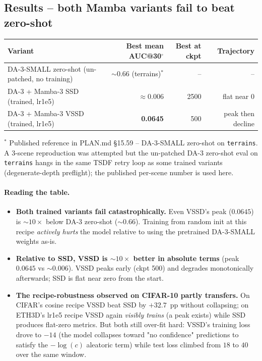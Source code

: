 \documentclass[11pt,a4paper]{article}
\begin{document}
\subsection{Results -- both Mamba variants fail to beat zero-shot}

\begin{center}
\begin{tabular}{lrrr}
\toprule
Variant                                  & Best mean AUC@30$^\circ$ & Best at ckpt & Trajectory   \\
\midrule
DA-3-SMALL zero-shot (un-patched, no training) & $\sim 0.66$ (terrains)$^*$ & --        & --           \\
DA-3 + Mamba-3 SSD (trained, lr1e5)      & $\approx 0.006$           & 2500         & flat near 0  \\
DA-3 + Mamba-3 VSSD (trained, lr1e5)     & \textbf{0.0645}           & 500          & peak then decline \\
\bottomrule
\end{tabular}
\end{center}

\noindent$^*$ Published reference in PLAN.md \S15.59 -- DA-3-SMALL
zero-shot on \texttt{terrains}. A 3-scene reproduction was attempted
but the un-patched DA-3 zero-shot eval on \texttt{terrains} hangs in
the same TSDF retry loop as some trained variants (degenerate-depth
preflight); the published per-scene number is used here.

\paragraph{Reading the table.}
\begin{itemize}
  \item \textbf{Both trained variants fail catastrophically.} Even
        VSSD's peak ($0.0645$) is $\sim 10\times$ below DA-3 zero-shot
        ($\sim 0.66$). Training from random init at this recipe
        \emph{actively hurts} the model relative to using the
        pretrained DA-3-SMALL weights as-is.
  \item \textbf{Relative to SSD, VSSD is $\sim 10\times$ better in
        absolute terms} (peak $0.0645$ vs $\sim 0.006$). VSSD peaks
        early (ckpt 500) and degrades monotonically afterwards;
        SSD is flat near zero from the start.
  \item \textbf{The recipe-robustness observed on CIFAR-10 partly
        transfers.} On CIFAR's cosine recipe VSSD beat SSD by
        $+32.7$~pp without collapsing; on ETH3D's lr1e5 recipe VSSD
        again \emph{visibly trains} (a peak exists) while SSD
        produces flat-zero metrics. But both still over-fit hard:
        VSSD's training loss drove to $-14$ (the model collapses
        toward "no confidence" predictions to satisfy the
        $-\log(c)$ aleatoric term) while test loss climbed from
        $18$ to $40$ over the same window.
\end{itemize}
\end{document}
